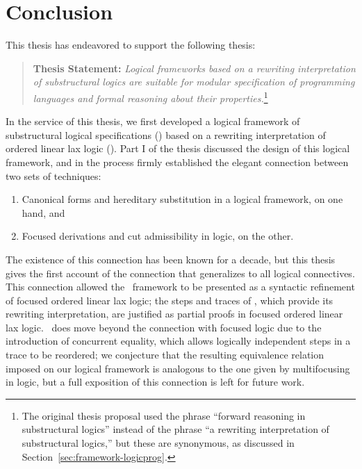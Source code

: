 \chapter{Conclusion}
\label{chapter-conclusion}

This thesis has endeavored to support the following thesis:
\smallskip
\begin{quote} {\bf Thesis Statement:} {\it Logical frameworks based on
    a rewriting interpretation of substructural logics are suitable
    for modular specification of programming languages and formal
    reasoning about their properties.}\footnote{The original thesis
    proposal used the phrase ``forward reasoning in substructural
    logics'' instead of the phrase ``a rewriting interpretation of
    substructural logics,'' but these are synonymous, as discussed in
    Section~\ref{sec:framework-logicprog}.}
\end{quote}
\bigskip


In the service of this thesis, we first developed a logical framework
of substructural logical specifications (\sls) based on a rewriting
interpretation of ordered linear lax logic (\ollll). Part I of the
thesis discussed the design of this logical framework, and in the
process firmly established the elegant connection between two sets of
techniques:

\smallskip
\begin{enumerate}
\item Canonical forms and hereditary
substitution in a logical framework, on one hand, and 
\item Focused derivations and cut
admissibility in logic, on the other.
\end{enumerate}

\smallskip
\noindent 
The existence of this connection has been known for a decade, but this
thesis gives the first account of the connection that generalizes to
all logical connectives. This connection allowed the \sls~framework to
be presented as a syntactic refinement of focused ordered linear lax
logic; the steps and traces of \sls, which provide its rewriting
interpretation, are justified as partial proofs in focused ordered
linear lax logic. \sls~does move beyond the connection with focused
logic due to the introduction of concurrent equality, which allows
logically independent steps in a trace to be reordered; we conjecture
that the resulting equivalence relation imposed on our logical
framework is analogous to the one given by multifocusing in logic, but
a full exposition of this connection is left for future work.

